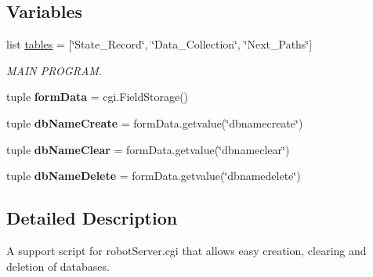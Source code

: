 \subsection*{Variables}
\begin{DoxyCompactItemize}
\item 
\hypertarget{namespacedatabase_manager_ab10af8887a52c00b2526556afc9e144e}{list \hyperlink{namespacedatabase_manager_ab10af8887a52c00b2526556afc9e144e}{tables} = \mbox{[}\char`\"{}State\+\_\+\+Record\char`\"{}, \char`\"{}Data\+\_\+\+Collection\char`\"{}, \char`\"{}Next\+\_\+\+Paths\char`\"{}\mbox{]}}\label{namespacedatabase_manager_ab10af8887a52c00b2526556afc9e144e}

\begin{DoxyCompactList}\small\item\em M\+A\+I\+N P\+R\+O\+G\+R\+A\+M. \end{DoxyCompactList}\item 
\hypertarget{namespacedatabase_manager_a6e185b7b0a5f9739231e396d1f2708c6}{tuple {\bfseries form\+Data} = cgi.\+Field\+Storage()}\label{namespacedatabase_manager_a6e185b7b0a5f9739231e396d1f2708c6}

\item 
\hypertarget{namespacedatabase_manager_abe0cedabe9f597c96eb60ac29e6fe510}{tuple {\bfseries db\+Name\+Create} = form\+Data.\+getvalue(\char`\"{}dbnamecreate\char`\"{})}\label{namespacedatabase_manager_abe0cedabe9f597c96eb60ac29e6fe510}

\item 
\hypertarget{namespacedatabase_manager_afbf6981dc9d63cc055637624e25fc191}{tuple {\bfseries db\+Name\+Clear} = form\+Data.\+getvalue(\char`\"{}dbnameclear\char`\"{})}\label{namespacedatabase_manager_afbf6981dc9d63cc055637624e25fc191}

\item 
\hypertarget{namespacedatabase_manager_a3f05fdb39fb73a3975595b77e291d9bd}{tuple {\bfseries db\+Name\+Delete} = form\+Data.\+getvalue(\char`\"{}dbnamedelete\char`\"{})}\label{namespacedatabase_manager_a3f05fdb39fb73a3975595b77e291d9bd}

\end{DoxyCompactItemize}


\subsection{Detailed Description}
A support script for robot\+Server.\+cgi that allows easy creation, clearing and deletion of databases. 

